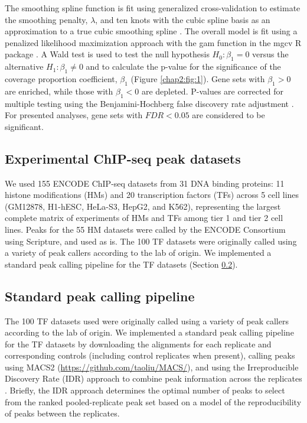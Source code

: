 The smoothing spline function is fit using generalized cross-validation to estimate the smoothing penalty, $\lambda$, and ten knots with the cubic spline basis as an approximation to a true cubic smoothing spline \cite{Wood:2010cl}. The overall model is fit using a penalized likelihood maximization approach with the gam function in the mgcv R package \cite{Wood:2010cl}. A Wald test is used to test the null hypothesis $H_0 : \beta_1 = 0$ versus the alternative $H_1 : \beta_1 \ne 0$ and to calculate the p-value for the significance of the coverage proportion coefficient, $\beta_1$ (Figure \ref{chap2:fig:1}). Gene sets with $\beta_1 > 0$ are enriched, while those with $\beta_1 < 0$ are depleted. P-values are corrected for multiple testing using the Benjamini-Hochberg false discovery rate adjustment \cite{Benjamini:1995cd}. For presented analyses, gene sets with $FDR < 0.05$ are considered to be significant.

\subsection{Experimental ChIP-seq peak datasets}
\label{broadenrich_methods_datasets}

We used 155 ENCODE ChIP-seq datasets from 31 DNA binding proteins: 11 histone modifications (HMs) and 20 transcription factors (TFs) across 5 cell lines (GM12878, H1-hESC, HeLa-S3, HepG2, and K562), representing the largest complete matrix of experiments of HMs and TFs among tier 1 and tier 2 cell lines. Peaks for the 55 HM datasets were called by the ENCODE Consortium using Scripture, and used as is. The 100 TF datasets were originally called using a variety of peak callers according to the lab of origin. We implemented a standard peak calling pipeline for the TF datasets (Section \ref{broadenrich_methods_peaks}).

\subsection{Standard peak calling pipeline}
\label{broadenrich_methods_peaks}
The 100 TF datasets used were originally called using a variety of peak callers according to the lab of origin. We implemented a standard peak calling pipeline for the TF datasets by downloading the alignments for each replicate and corresponding controls (including control replicates when present), calling peaks using MACS2 (\url{https://github.com/taoliu/MACS/}), and using the Irreproducible Discovery Rate (IDR) approach to combine peak information across the replicates \cite{Li:2011gg}. Briefly, the IDR approach determines the optimal number of peaks to select from the ranked pooled-replicate peak set based on a model of the reproducibility of peaks between the replicates.

